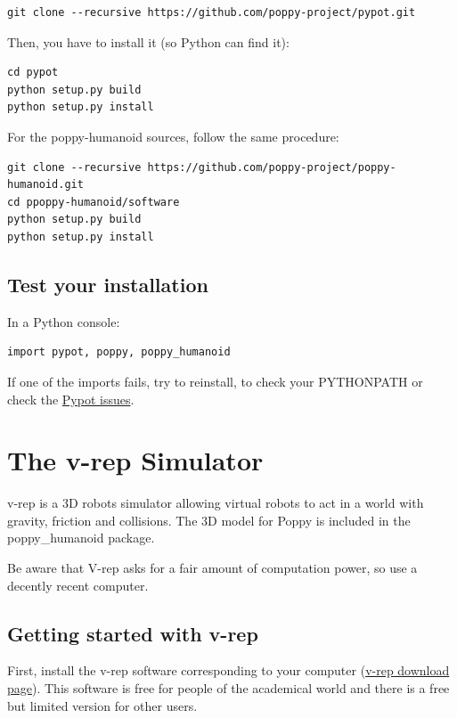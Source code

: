 \documentclass{article}
\begin{document}
\begin{verbatim}
git clone --recursive https://github.com/poppy-project/pypot.git
\end{verbatim}

Then, you have to install it (so Python can find it):

\begin{verbatim}
cd pypot
python setup.py build
python setup.py install
\end{verbatim}

For the poppy-humanoid sources, follow the same procedure:

\begin{verbatim}
git clone --recursive https://github.com/poppy-project/poppy-humanoid.git
cd ppoppy-humanoid/software
python setup.py build
python setup.py install
\end{verbatim}

\subsection{Test your installation}

In a Python console:

\begin{verbatim}
import pypot, poppy, poppy_humanoid
\end{verbatim}

If one of the imports fails, try to reinstall, to check your PYTHONPATH or check the \href{https://github.com/poppy-project/pypot/issues}{Pypot issues}.



\section{The v-rep Simulator}
\label{v-rep}

v-rep is a 3D robots simulator allowing virtual robots to act in a world with gravity, friction and collisions. The 3D model for Poppy is included in the poppy\_humanoid package.

Be aware that V-rep asks for a fair amount of computation power, so use a decently recent computer.

\subsection{Getting started with v-rep}

First, install the v-rep software corresponding to your computer (\href{http://www.coppeliarobotics.com/downloads.html}{v-rep download page}). This software is free for people of the academical world and there is a free but limited version for other users.
\end{document}
